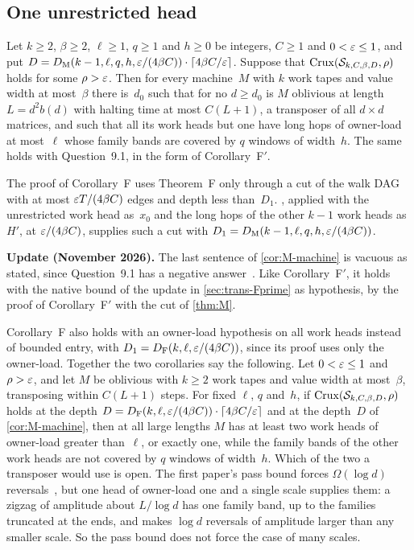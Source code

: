 \subsection{One unrestricted head}\label{sec:trans-M}

\begin{corollary}\label{cor:M-machine}
\notformalized
Let $k\ge2$, $\beta\ge2$, $\ell\ge1$, $q\ge1$ and $h\ge0$ be integers, $C\ge1$ and $0<\varepsilon\le1$, and put
$D=D_{\mathrm M}(k-1,\ell,q,h,\varepsilon/(4\beta C))\cdot\lceil4\beta C/\varepsilon\rceil$. Suppose that $\mathrm{Crux}(\mathcal S_{k,C,\beta,D},\rho)$ holds
for some $\rho>\varepsilon$. Then for every machine~$M$ with $k$ work tapes and value width at most~$\beta$ there is~$d_0$ such that
for no $d\ge d_0$ is $M$ oblivious at length $L=d^2b(d)$ with halting time at most $C(L+1)$, a transposer of all
$d\times d$ matrices, and such that all its work heads but one have long hops of owner-load at most~$\ell$ whose family bands
are covered by $q$ windows of width~$h$. The same holds with Question~9.1, in the form of Corollary~F$'$.
\end{corollary}

\begin{informalproof}
The proof of Corollary~F uses Theorem~F only through a cut of the walk DAG with at most $\varepsilon T/(4\beta C)$ edges and depth less
than~$D_1$. , applied with the unrestricted work head as~$x_0$ and the long hops of the other $k-1$ work heads
as~$H'$, at $\varepsilon/(4\beta C)$, supplies such a cut with $D_1=D_{\mathrm M}(k-1,\ell,q,h,\varepsilon/(4\beta C))$.
\end{informalproof}

\textbf{Update (November 2026).} The last sentence of \cref{cor:M-machine} is vacuous as stated, since Question~9.1 has a
negative answer~\cite{StorageCodes2026}. Like Corollary~F$'$, it holds with the native bound of the update in
\cref{sec:trans-Fprime} as hypothesis, by the proof of Corollary~F$'$ with the cut of \cref{thm:M}.

Corollary~F also holds with an owner-load hypothesis on all work heads instead of bounded entry, with
$D_1=D_{\mathrm F}(k,\ell,\varepsilon/(4\beta C))$, since its proof uses only the owner-load. Together the two corollaries say the following.
Let $0<\varepsilon\le1$ and $\rho>\varepsilon$, and let $M$ be oblivious with $k\ge2$ work tapes and value width at most~$\beta$,
transposing within $C(L+1)$ steps. For fixed $\ell$, $q$ and~$h$, if $\mathrm{Crux}(\mathcal S_{k,C,\beta,D},\rho)$ holds at the depth
$D=D_{\mathrm F}(k,\ell,\varepsilon/(4\beta C))\cdot\lceil4\beta C/\varepsilon\rceil$ and at the depth~$D$ of \cref{cor:M-machine}, then at all
large lengths $M$ has at least two work heads of owner-load greater than~$\ell$, or exactly one, while the family bands of
the other work heads are not covered by $q$ windows of width~$h$. Which of the two a transposer would use is open. The first paper's pass bound forces $\Omega(\log d)$
reversals~\cite[Theorem~5.12]{FirstPaper2026}, but one head of owner-load one and a single scale supplies them: a zigzag of
amplitude about $L/\log d$ has one family band, up to the families truncated at the ends, and makes $\log d$ reversals of
amplitude larger than any smaller scale. So the pass bound does not force the case of many scales.
